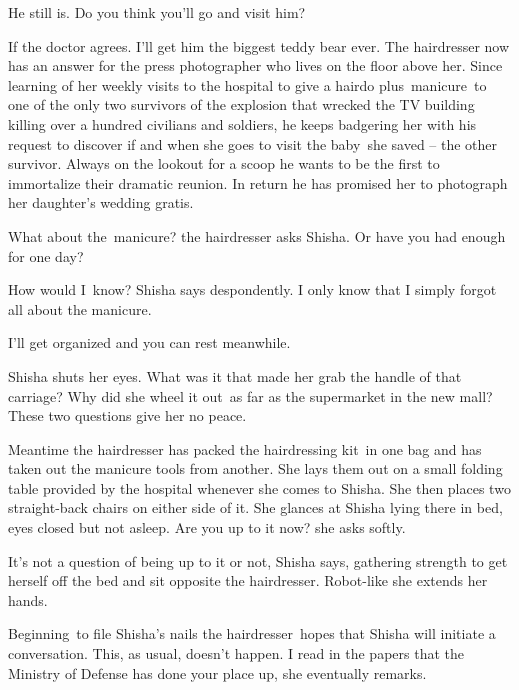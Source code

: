 \documentclass[letterpaper]{article}
\begin{document}
{\textquotedbl}He still is. Do you think you'll go and visit him?{\textquotedbl} 

{\textquotedbl}If the doctor agrees. I'll get him the biggest teddy bear ever.{\textquotedbl} The hairdresser now has an
answer for the press photographer who lives on the floor above her. Since learning of her weekly visits to the hospital
to give a hairdo plus~manicure~to one of the only two survivors of the explosion that wrecked the TV building killing
over a hundred civilians and soldiers, he keeps badgering her with his request to discover if and when she goes to
visit the baby~she saved -- the other survivor. Always on the lookout for a scoop he wants to be the first to
immortalize their dramatic reunion. In return he has promised her to photograph her daughter's wedding gratis.~ 

{\textquotedbl}What about the~manicure?{\textquotedbl} the hairdresser asks Shisha. {\textquotedbl}Or have you had
enough for one day?{\textquotedbl} 

{\textquotedbl}How would I~know?{\textquotedbl} Shisha says despondently. {\textquotedbl}I only know that I simply
forgot all about the manicure.{\textquotedbl} 

{\textquotedbl}I'll get organized and you can rest meanwhile.{\textquotedbl} 

Shisha shuts her eyes. What was it that made her grab the handle of that carriage? Why did she wheel it out\ as far as
the supermarket in the new mall? These two questions give her no peace. 

Meantime the hairdresser has packed the hairdressing kit~in one bag and has taken out the manicure tools from another.
She lays them out on a small folding table provided by the hospital whenever she comes to Shisha. She then places two
straight-back chairs on either side of it. She glances at Shisha lying there in bed, eyes closed but not asleep.
{\textquotedbl}Are you up to it now?{\textquotedbl} she asks softly.

{\textquotedbl}It's not a question of being up to it or not,{\textquotedbl} Shisha says, gathering strength to get
herself off the bed and sit opposite the hairdresser. Robot-like she extends her hands. 

Beginning~to file Shisha's nails the hairdresser\ hopes that Shisha will initiate a conversation. This, as usual,
doesn't happen. {\textquotedbl}I read in the papers that the Ministry of Defense has done your place up,{\textquotedbl}
she eventually remarks. 
\end{document}
